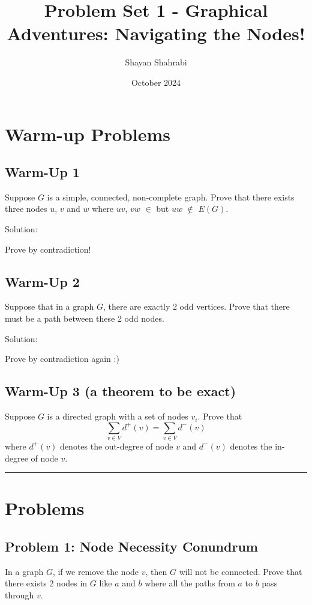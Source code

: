 \documentclass{article}
\title{Problem Set 1 - Graphical Adventures: Navigating the Nodes!}
\author{Shayan Shahrabi}
\date{October 2024}
\begin{document}
\maketitle

\section*{Warm-up Problems}

\subsection*{Warm-Up 1}
Suppose $G$ is a simple, connected, non-complete graph. Prove that there exists
three nodes $u$, $v$ and $w$ where $uv$, $vw$ $\in$ but $uw$ $\notin$ $E(G)$.

Solution:

Prove by contradiction!

\subsection*{Warm-Up 2}
Suppose that in a graph $G$, there are exactly 2 odd vertices. Prove that there must be a path between these 2 odd nodes.

Solution:
 
Prove by contradiction again :)



\subsection*{Warm-Up 3 (a theorem to be exact)}
Suppose $G$ is a directed graph with a set of nodes $v_i$. Prove that 
\[
\sum_{v \in V} d^+(v) = \sum_{v \in V} d^-(v)
\]
where $d^+(v)$ denotes the out-degree of node $v$ and $d^-(v)$ denotes the in-degree of node $v$.

\vspace{20pt}
\hrule
\vspace{20pt}

\section*{Problems}

\subsection*{Problem 1: Node Necessity Conundrum}

In a graph $G$, if we remove the node $v$, then $G$ will not be connected. Prove that there exists 2 nodes in $G$ like $a$ and $b$ where all the paths from $a$ to $b$ pass through $v$.
\end{document}
